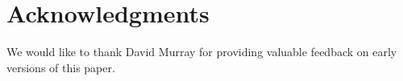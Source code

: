 \section{Acknowledgments} 

We would like to thank David Murray for providing valuable feedback on
early versions of this paper.
